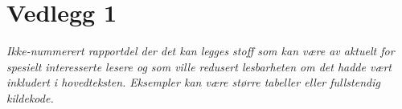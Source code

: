 \section{Vedlegg 1}
\label{sec:vedlegg1}
\textit{Ikke-nummerert rapportdel der det kan legges stoff som kan være av aktuelt for spesielt interesserte lesere og som ville redusert lesbarheten om det hadde vært inkludert i hovedteksten. Eksempler kan være større tabeller eller fullstendig kildekode.}
